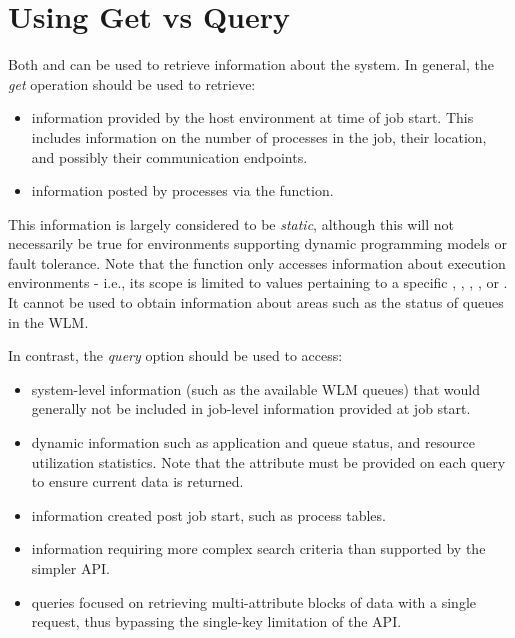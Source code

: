 \begin{arglist}
\end{arglist}


\section{Using Get vs Query}
\label{chap:api_job_mgmt:query}

Both  and  can be used to retrieve information about the system. In general, the \emph{get} operation should be used to retrieve:

\begin{itemize}
\item information provided by the host environment at time of job start. This includes information on the number of processes in the job, their location, and possibly their communication endpoints.
\item information posted by processes via the  function.
\end{itemize}

This information is largely considered to be \emph{static}, although this will not necessarily be true for environments supporting dynamic programming models or fault tolerance. Note that the  function only accesses information about execution environments - i.e., its scope is limited to values pertaining to a specific , , , , or . It cannot be used to obtain information about areas such as the status of queues in the \ac{WLM}.

In contrast, the \emph{query} option should be used to access:

\begin{itemize}
\item system-level information (such as the available \ac{WLM} queues) that would generally not be included in job-level information provided at job start.
\item dynamic information such as application and queue status, and resource utilization statistics. Note that the  attribute must be provided on each query to ensure current data is returned.
\item information created post job start, such as process tables.
\item information requiring more complex search criteria than supported by the simpler  \ac{API}.
\item queries focused on retrieving multi-attribute blocks of data with a single request, thus bypassing the single-key limitation of the  \ac{API}.
\end{itemize}

